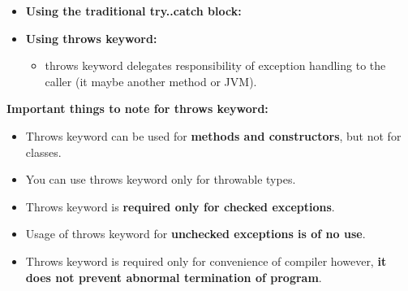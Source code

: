 \begin{flushleft}
		\begin{itemize}
			\item \textbf{Using the traditional try..catch block:}
			\bigskip
			\bigskip
			\item \textbf{Using throws keyword:}
			\begin{itemize}
				\item throws keyword delegates responsibility of exception handling to the caller (it maybe another method or JVM).
				\bigskip
				
			\end{itemize}
		\end{itemize}
		
		\newpage
		\textbf{Important things to note for throws keyword:}
		\begin{itemize}
			\item Throws keyword can be used for \textbf{methods and constructors}, but not for classes.
			\item You can use throws keyword only for throwable types. 
			\item Throws keyword is \textbf{required only for checked exceptions}.
			\item Usage of throws keyword for \textbf{unchecked exceptions is of no use}.
			\item Throws keyword is required only for convenience of compiler however,\textbf{ it does not prevent abnormal termination of program}.
		\end{itemize}
	
\end{flushleft}






